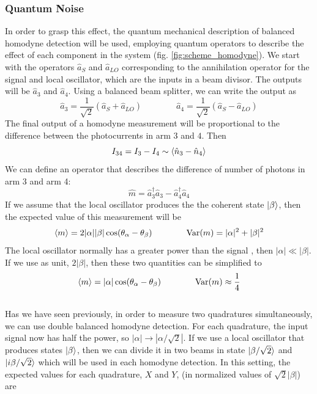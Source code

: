\subsubsection{Quantum Noise}
In order to grasp this effect, the quantum mechanical description of balanced homodyne detection will be used, employing quantum operators to describe the effect of each component in the system (fig. \ref{fig:scheme_homodyne}). We start with the operators $\hat{a}_S$ and $\hat{a}_{LO}$ corresponding to the annihilation operator for the signal and local oscillator, which are the inputs in a beam divisor. The outputs will be $\hat{a}_3$ and $\hat{a}_4$.
Using a balanced beam splitter, we can write the output as
%
\begin{equation}
\hat{a}_3 = \frac{1}{\sqrt{2}} \left( \hat{a}_S + \hat{a}_{LO} \right)
\qquad
\qquad
\hat{a}_4 = \frac{1}{\sqrt{2}} \left( \hat{a}_S - \hat{a}_{LO} \right)
\end{equation}
%
The final output of a homodyne measurement will be proportional to the difference between the photocurrents in arm $3$ and $4$. Then
%
\begin{equation}
I_{34} = I_3 - I_4 \sim \braket{\hat{n}_3 - \hat{n}_4}
\end{equation}
%
We can define an operator that describes the difference of number of photons in arm 3 and arm 4:
%
\begin{equation}
\hat{m} = \hat{a}^\dagger_3\hat{a}_3 - \hat{a}^\dagger_4\hat{a}_4
\end{equation}
%
If we assume that the local oscillator produces the the coherent state $\ket{\beta}$, then the expected value of this measurement will be
%
\begin{equation}
\label{eq:noise}
\braket{m} = 2|\alpha||\beta|\cos({\theta_\alpha - \theta_\beta})
\qquad
\qquad
\textrm{Var}(m) = |\alpha|^2 + |\beta|^2
\end{equation}
%
The local oscillator normally has a greater power than the signal
, then $|\alpha| \ll |\beta|$. If we use as unit, $2|\beta|$, then these two quantities can be simplified to
%
\begin{equation}
\label{eq:approx_noise}
\braket{m} = |\alpha|\cos({\theta_\alpha - \theta_\beta})
\qquad
\qquad
\textrm{Var}(m) \approx \frac{1}{4}
\end{equation}
%
\cite{hans2004}
\\
Has we have seen previously, in order to measure two quadratures simultaneously, we can use double balanced homodyne detection. For each quadrature, the input signal now has half the power, so $|\alpha| \rightarrow |\alpha/\sqrt{2}|$.  If we use a local oscillator that produces states $\ket{\beta}$, then we can divide it in two beams in state $\ket{\beta/\sqrt{2}}$ and $\ket{i\beta/\sqrt{2}}$ which will be used in each homodyne detection. In this setting, the expected values for each quadrature, $X$ and $Y$, (in normalized values of $\sqrt{2}|\beta|$) are
